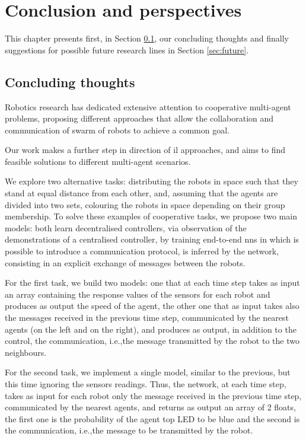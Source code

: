 \chapter*{Conclusion and perspectives}
\label{chap:concl}
 
This chapter presents first, in Section \ref{sec:concl}, our concluding thoughts and 
finally suggestions for possible future research lines in Section \ref{sec:future}.

\section{Concluding thoughts}
\label{sec:concl}
Robotics research has dedicated extensive attention to cooperative multi-agent 
problems, proposing different approaches that allow the collaboration and 
communication of swarm of robots to achieve a common goal.

Our work makes a further step in direction of \gls{il} approaches, and aims to 
find feasible solutions to different multi-agent scenarios.

We explore two alternative tasks: distributing the robots in space such that they 
stand at equal distance from each other, and, assuming that the agents are 
divided into two sets, colouring the robots in space depending on their group 
membership.
To solve these examples of cooperative tasks, we propose two main models: both 
learn decentralised controllers, via observation of the demonstrations of a 
centralised controller, by training end-to-end \glspl{nn} in which is possible to
introduce a communication protocol, is inferred by the network, consisting in an 
explicit exchange of messages between the robots.

For the first task, we build two models: one that at each time step takes as input 
an array containing the response values of the sensors for each robot and 
produces as output the speed of the agent, the other one that as input takes also 
the messages received in the previous time step, communicated by the nearest 
agents (on the left and on the right), and produces as output, in addition to the 
control, the communication, i.e.,the message transmitted by the robot to the two 
neighbours. 

For the second task, we implement a single model, similar to the previous, but this 
time ignoring the sensors readings. Thus, the network, at each time step, takes as 
input for each robot only the message received in the previous time step, 
communicated by the nearest agents, and returns as output an array of 2 floats, 
the first one is the probability of the agent top LED to be blue and the second is 
the communication, i.e.,the message to be transmitted by the robot.

